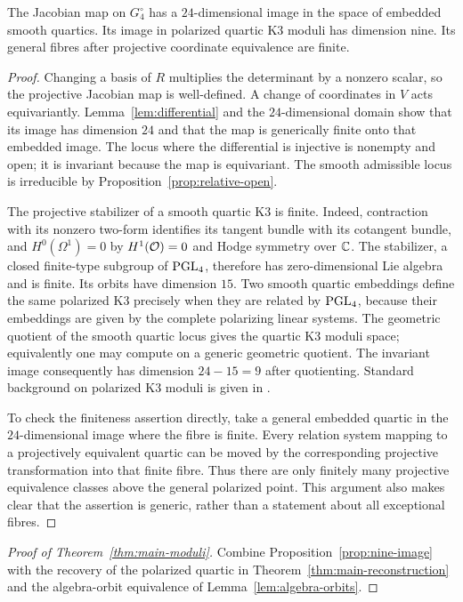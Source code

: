 \begin{proposition}\label{prop:nine-image}
The Jacobian map on $G_4^\circ$ has a $24$-dimensional image in the
space of embedded smooth quartics. Its image in polarized quartic K3
moduli has dimension nine. Its general fibres after projective
coordinate equivalence are finite.
\end{proposition}
\begin{proof}
Changing a basis of $R$ multiplies the determinant by a nonzero scalar,
so the projective Jacobian map is well-defined. A change of coordinates
in $V$ acts equivariantly. Lemma~\ref{lem:differential} and the
$24$-dimensional domain show that its image has dimension $24$ and
that the map is generically finite onto that embedded image. The locus
where the differential is injective is nonempty and open; it is invariant
because the map is equivariant. The smooth admissible locus is
irreducible by Proposition~\ref{prop:relative-open}.

The projective stabilizer of a smooth quartic K3 is finite. Indeed,
contraction with its nonzero two-form identifies its tangent bundle
with its cotangent bundle, and $H^0(\Omega^1)=0$ by $H^1(\mathcal O)=0$
and Hodge symmetry over $\mathbb C$. The stabilizer, a closed finite-type
subgroup of $\operatorname{PGL}_4$, therefore has zero-dimensional Lie algebra and
is finite. Its orbits have dimension $15$. Two smooth quartic
embeddings define the same polarized K3 precisely when they are related
by $\operatorname{PGL}_4$, because their embeddings are given by the complete
polarizing linear systems. The geometric quotient of the smooth
quartic locus gives the quartic K3 moduli space; equivalently one may
compute on a generic geometric quotient. The invariant image consequently
has dimension $24-15=9$ after quotienting. Standard background on
polarized K3 moduli is given in \cite[Chapter 5]{Huy}.

To check the finiteness assertion directly, take a general embedded
quartic in the $24$-dimensional image where the fibre is finite.
Every relation system mapping to a projectively equivalent quartic
can be moved by the corresponding projective transformation into that
finite fibre. Thus there are only finitely many projective equivalence
classes above the general polarized point. This argument also makes
clear that the assertion is generic, rather than a statement about
all exceptional fibres.
\end{proof}

\begin{proof}[Proof of Theorem~\ref{thm:main-moduli}]
Combine Proposition~\ref{prop:nine-image} with the recovery of the
polarized quartic in Theorem~\ref{thm:main-reconstruction} and the
algebra-orbit equivalence of Lemma~\ref{lem:algebra-orbits}.
\end{proof}

